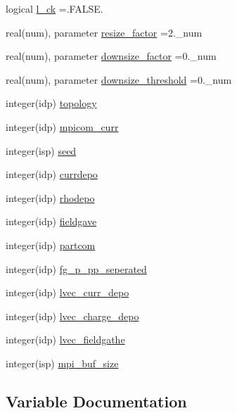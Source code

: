 \begin{DoxyCompactItemize}
logical \hyperlink{namespaceparams_a7e70ec0bfba23188ddeb3004e464a69b}{l\+\_\+ck} =.F\+A\+L\+S\+E.
\item 
real(num), parameter \hyperlink{namespaceparams_a70195e670ef122bc4f91d74793b68621}{resize\+\_\+factor} =2.\+\_\+num
\item 
real(num), parameter \hyperlink{namespaceparams_a1e70b45a865ed6ef7927e0b49669a567}{downsize\+\_\+factor} =0.\+\_\+num
\item 
real(num), parameter \hyperlink{namespaceparams_aa81c22d18e165451716c4b23ea6fbdb1}{downsize\+\_\+threshold} =0.\+\_\+num
\item 
integer(idp) \hyperlink{namespaceparams_a259d1ed7155ef66db12c877a797fc0f0}{topology}
\item 
integer(idp) \hyperlink{namespaceparams_a5e7c931ca55f3ac5e5171dc97c3269b1}{mpicom\+\_\+curr}
\item 
integer(isp) \hyperlink{namespaceparams_ae32095407c8380779cfc1562a62d15e3}{seed}
\item 
integer(idp) \hyperlink{namespaceparams_af4ccf29a8c1f3a8a47f08f5cbbcd30eb}{currdepo}
\item 
integer(idp) \hyperlink{namespaceparams_ae892561d7462a1e54b9b6b2bbe1adc4c}{rhodepo}
\item 
integer(idp) \hyperlink{namespaceparams_afd98a17f8dde6a4f7d4e7b0efb7384ea}{fieldgave}
\item 
integer(idp) \hyperlink{namespaceparams_aa63204e737d29465924b4275b46ddfb3}{partcom}
\item 
integer(idp) \hyperlink{namespaceparams_a58efb719fdc3fbbfa8c6beb237ce2716}{fg\+\_\+p\+\_\+pp\+\_\+seperated}
\item 
integer(idp) \hyperlink{namespaceparams_aedb04c2dd01619937eaad2ce0a2626a5}{lvec\+\_\+curr\+\_\+depo}
\item 
integer(idp) \hyperlink{namespaceparams_a73dceeb78f9f0abe2d39ba48e2aee2d9}{lvec\+\_\+charge\+\_\+depo}
\item 
integer(idp) \hyperlink{namespaceparams_acb2db26088c715aabd2ca6722e0bcdc6}{lvec\+\_\+fieldgathe}
\item 
integer(isp) \hyperlink{namespaceparams_aa785f776093a166811d21fa25c320b75}{mpi\+\_\+buf\+\_\+size}
\end{DoxyCompactItemize}


\subsection{Variable Documentation}

